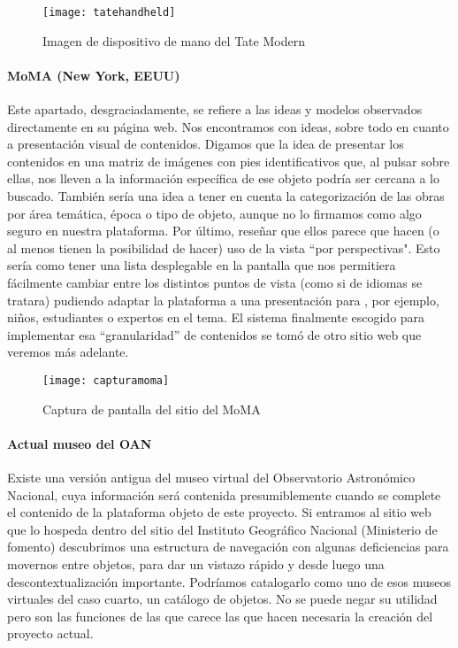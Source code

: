 \begin{figure}
\begin{narrow}{-0.1\linewidth}{-0.1\linewidth}
\centering
\texttt{[image: tatehandheld]}
\caption{Imagen de dispositivo de mano del Tate Modern\cite{references:tatehandheld}}
\end{narrow}
\label{fig:moma}
\end{figure}



\paragraph{MoMA (New York, EEUU)}
\par Este apartado, desgraciadamente, se refiere a las ideas y modelos observados directamente en su página web. Nos encontramos con ideas, sobre todo en cuanto a presentación visual de contenidos. Digamos que la idea de presentar los contenidos en una matriz de imágenes con pies identificativos que, al pulsar sobre ellas, nos lleven a la información específica de ese objeto podría ser cercana a lo buscado. También sería una idea a tener en cuenta la categorización de las obras por área temática, época o tipo de objeto, aunque no lo firmamos como algo seguro en nuestra plataforma. Por último, reseñar que ellos parece que hacen (o al menos tienen la posibilidad de hacer) uso de la vista ``por perspectivas". Esto sería como tener una lista desplegable en la pantalla que nos permitiera fácilmente cambiar entre los distintos puntos de vista (como si de idiomas se tratara) pudiendo adaptar la plataforma a una presentación para , por ejemplo, niños, estudiantes o expertos en el tema. El sistema finalmente escogido para implementar esa ``granularidad'' de contenidos se tomó de otro sitio web que veremos más adelante.

\begin{figure}
\begin{narrow}{-0.1\linewidth}{-0.1\linewidth}
\centering
\texttt{[image: capturamoma]}
\caption{Captura de pantalla del sitio del MoMA}
\end{narrow}
\label{fig:moma}
\end{figure}



\paragraph{Actual museo del OAN}
\par Existe una versión antigua del museo virtual del Observatorio Astronómico Nacional, cuya información será contenida presumiblemente cuando se complete el contenido de la plataforma objeto de este proyecto. Si entramos al sitio web que lo hospeda dentro del sitio del Instituto Geográfico Nacional (Ministerio de fomento) descubrimos una estructura de navegación con algunas deficiencias para movernos entre objetos, para dar un vistazo rápido y desde luego una descontextualización importante. Podríamos catalogarlo como uno de esos museos virtuales del caso cuarto, un catálogo de objetos. No se puede negar su utilidad pero son las funciones de las que carece las que hacen necesaria la creación del proyecto actual.

